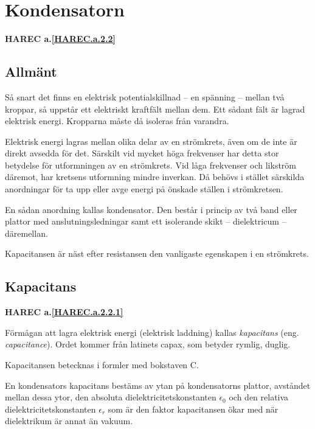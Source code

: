 \section{Kondensatorn}
\textbf{HAREC a.\ref{HAREC.a.2.2}\label{myHAREC.a.2.2}}

\subsection{Allmänt}

Så snart det finns en elektrisk potentialskillnad -- en spänning -- mellan två
kroppar, så uppstår ett elektriskt kraftfält mellan dem. Ett sådant fält är
lagrad elektrisk energi. Kropparna måste då isoleras från varandra.

Elektrisk energi lagras mellan olika delar av en strömkrets, även om de inte är
direkt avsedda för det. Särskilt vid mycket höga frekvenser har detta stor
betydelse för utformningen av en strömkrets. Vid låga frekvenser och likström
däremot, har kretsens utformning mindre inverkan. Då behövs i stället särskilda
anordningar för ta upp eller avge energi på önskade ställen i strömkretsen.

En sådan anordning kallas kondensator. Den består i princip av två band eller
plattor med anslutningsledningar samt ett isolerande skikt -- dielektricum --
däremellan.

Kapacitansen är näst efter resistansen den vanligaste egenskapen i en
strömkrets.

\subsection{Kapacitans}
\textbf{HAREC a.\ref{HAREC.a.2.2.1}\label{myHAREC.a.2.2.1}}

Förmågan att lagra elektrisk energi (elektrisk laddning) kallas
\emph{kapacitans} (eng. \emph{capacitance}).
Ordet kommer från latinets capax, som betyder rymlig, duglig.

Kapacitansen betecknas i formler med bokstaven C.

En kondensators kapacitans bestäms av ytan på kondensatorns plattor,
avståndet mellan dessa ytor, den absoluta dielektricitetskonstanten
\(\epsilon_0\) och den relativa dielektricitetskonstanten \(\epsilon_r\) som är
den faktor kapacitansen ökar med när dielektrikum är annat än vakuum.

